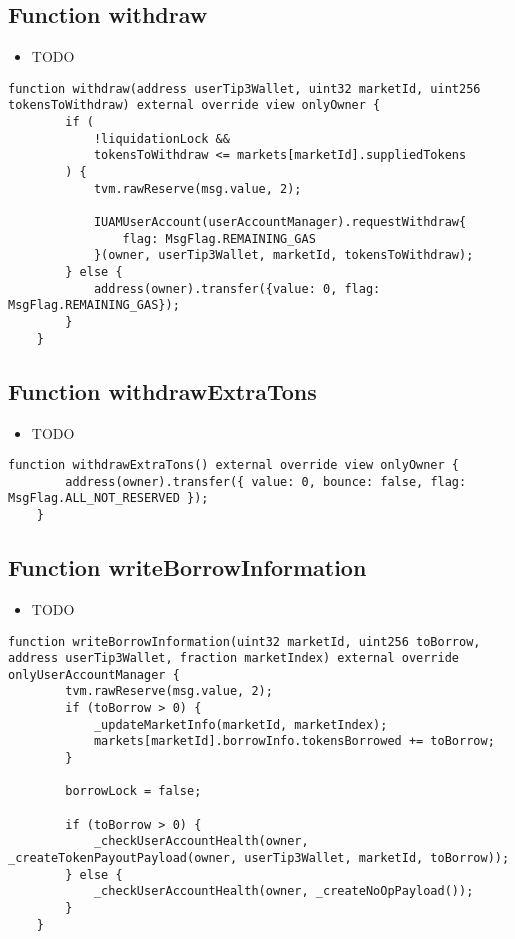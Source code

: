 \subsection{Function withdraw}

\noindent\begin{itemize}
\item TODO
\end{itemize}

\begin{lstlisting}[firstnumber=123]
    function withdraw(address userTip3Wallet, uint32 marketId, uint256 tokensToWithdraw) external override view onlyOwner {
        if (
            !liquidationLock &&
            tokensToWithdraw <= markets[marketId].suppliedTokens
        ) {
            tvm.rawReserve(msg.value, 2);
            
            IUAMUserAccount(userAccountManager).requestWithdraw{
                flag: MsgFlag.REMAINING_GAS
            }(owner, userTip3Wallet, marketId, tokensToWithdraw);
        } else {
            address(owner).transfer({value: 0, flag: MsgFlag.REMAINING_GAS});
        }
    }
\end{lstlisting}

\subsection{Function withdrawExtraTons}

\noindent\begin{itemize}
\item TODO
\end{itemize}

\begin{lstlisting}[firstnumber=406]
    function withdrawExtraTons() external override view onlyOwner {
        address(owner).transfer({ value: 0, bounce: false, flag: MsgFlag.ALL_NOT_RESERVED });
    }
\end{lstlisting}

\subsection{Function writeBorrowInformation}

\noindent\begin{itemize}
\item TODO
\end{itemize}

\begin{lstlisting}[firstnumber=204]
    function writeBorrowInformation(uint32 marketId, uint256 toBorrow, address userTip3Wallet, fraction marketIndex) external override onlyUserAccountManager {
        tvm.rawReserve(msg.value, 2);
        if (toBorrow > 0) {
            _updateMarketInfo(marketId, marketIndex);
            markets[marketId].borrowInfo.tokensBorrowed += toBorrow;
        }

        borrowLock = false;

        if (toBorrow > 0) {
            _checkUserAccountHealth(owner, _createTokenPayoutPayload(owner, userTip3Wallet, marketId, toBorrow));
        } else {
            _checkUserAccountHealth(owner, _createNoOpPayload());
        }
    }
\end{lstlisting}

